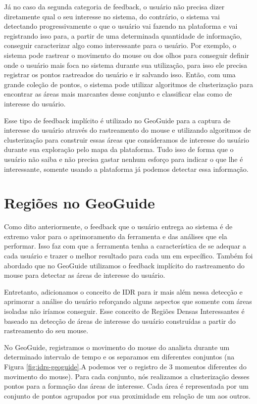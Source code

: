 Já no caso da segunda categoria de feedback, o usuário não precisa dizer diretamente qual o seu interesse no sistema, do contrário, o sistema vai detectando progressivamente o que o usuário vai fazendo na plataforma e vai registrando isso para, a partir de uma determinada quantidade de informação, conseguir caracterizar algo como interessante para o usuário. Por exemplo, o sistema pode rastrear o movimento do mouse ou dos olhos para conseguir definir onde o usuário mais foca no sistema durante sua utilização, para isso ele precisa registrar os pontos rastreados do usuário e ir salvando isso. Então, com uma grande coleção de pontos, o sistema pode utilizar algoritmos de clusterização para encontrar as áreas mais marcantes desse conjunto e classificar elas como de interesse do usuário.

Esse tipo de feedback implícito é utilizado no GeoGuide para a captura de interesse do usuário através do rastreamento do mouse e utilizando algoritmos de clusterização para construir essas áreas que consideramos de interesse do usuário durante sua exploração pelo mapa da plataforma. Tudo isso de forma que o usuário não saiba e não precisa gastar nenhum esforço para indicar o que lhe é interessante, somente usando a plataforma já podemos detectar essa informação.

\section{Regiões no GeoGuide}

Como dito anteriormente, o feedback que o usuário entrega ao sistema é de extremo valor para o aprimoramento da ferramenta e das análises que ela performar. Isso faz com que a ferramenta tenha a característica de se adequar a cada usuário e trazer o melhor resultado para cada um em específico. Também foi abordado que no GeoGuide utilizamos o feedback implícito do rastreamento do mouse para detectar as áreas de interesse do usuário.

Entretanto, adicionamos o conceito de IDR para ir mais além nessa detecção e aprimorar a análise do usuário reforçando alguns aspectos que somente com áreas isoladas não iríamos conseguir. Esse conceito de Regiões Densas Interessantes é baseado na detecção de áreas de interesse do usuário construídas a partir do rastreamento do seu mouse.

No GeoGuide, registramos o movimento do mouse do analista durante um determinado intervalo de tempo e os separamos em diferentes conjuntos (na Figura \ref{fig:idrs-geoguide}.A podemos ver o registro de 3 momentos diferentes do movimento do mouse). Para cada conjunto, nós realizamos a clusterização desses pontos para a formação das áreas de interesse. Cada área é representada por um conjunto de pontos agrupados por sua proximidade em relação de um aos outros.

